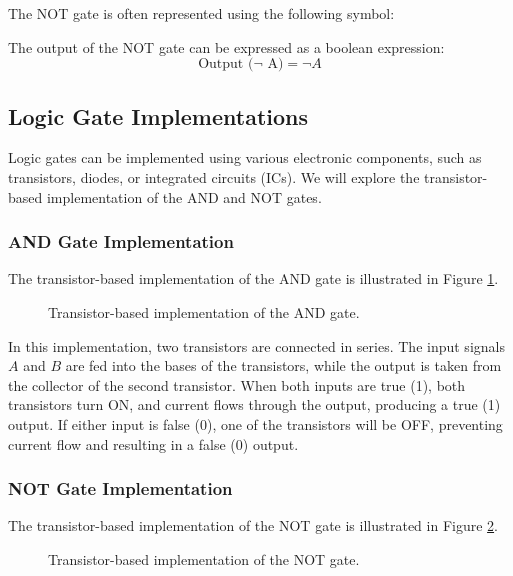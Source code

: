 \documentclass{article}
\begin{document}
The NOT gate is often represented using the following symbol:

\begin{center}
\end{center}

The output of the NOT gate can be expressed as a boolean expression:
\[ \text{Output ($\lnot$ A)} = \lnot A \]

\subsection{Logic Gate Implementations}

Logic gates can be implemented using various electronic components, such as transistors, diodes, or integrated circuits (ICs). We will explore the transistor-based implementation of the AND and NOT gates.

\subsubsection{AND Gate Implementation}

The transistor-based implementation of the AND gate is illustrated in Figure \ref{fig:and_gate_implementation}.

\begin{figure}[h]
  \centering
  \caption{Transistor-based implementation of the AND gate.}
  \label{fig:and_gate_implementation}
\end{figure}

In this implementation, two transistors are connected in series. The input signals $A$ and $B$ are fed into the bases of the transistors, while the output is taken from the collector of the second transistor. When both inputs are true (1), both transistors turn ON, and current flows through the output, producing a true (1) output. If either input is false (0), one of the transistors will be OFF, preventing current flow and resulting in a false (0) output.

\subsubsection{NOT Gate Implementation}

The transistor-based implementation of the NOT gate is illustrated in Figure \ref{fig:not_gate_implementation}.

\begin{figure}[h]
  \centering
  \caption{Transistor-based implementation of the NOT gate.}
  \label{fig:not_gate_implementation}
\end{figure}
\end{document}
